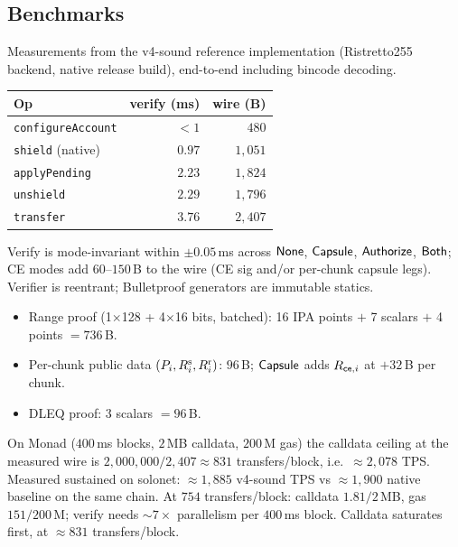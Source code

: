 \subsection{Benchmarks }
\label{sec:benchmarks}

Measurements from the v4-sound reference implementation
(Ristretto255 backend, native release build),
end-to-end including bincode decoding.

%
\begin{center}
\begin{tabular}{@{}l r r@{}}
  \toprule
  \textbf{Op} & \textbf{verify (ms)} & \textbf{wire (B)} \\
  \midrule
  \texttt{configureAccount}     & $<\!1$  & $480$    \\
  \texttt{shield} (native)      & $0.97$  & $1{,}051$ \\
  \texttt{applyPending}         & $2.23$  & $1{,}824$ \\
  \texttt{unshield}             & $2.29$  & $1{,}796$ \\
  \texttt{transfer}             & $3.76$  & $2{,}407$ \\
  \bottomrule
\end{tabular}
\end{center}
%
Verify is mode-invariant within $\pm 0.05$\,ms across $\mathsf{None}$,
$\mathsf{Capsule}$, $\mathsf{Authorize}$, $\mathsf{Both}$; CE modes add $60$--$150$\,B to the
wire (CE sig and/or per-chunk capsule legs).
Verifier is reentrant; Bulletproof generators are immutable statics.

%
\begin{itemize}[itemsep=.5pt]
    \item Range proof (1{$\times$}128 + 4{$\times$}16 bits, batched): 16 IPA points $+$ 7 scalars $+$ 4 points $= 736$\,B.
    \item Per-chunk public data $(P_{i}, R^{\rm s}_{i}, R^{\rm r}_{i})$: $96$\,B; $\mathsf{Capsule}$ adds $R_{{\sf ce},i}$ at $+32$\,B per chunk.
    \item DLEQ proof: $3$ scalars $= 96$\,B.
\end{itemize}

On Monad ($400$\,ms blocks, $2$\,MB calldata, $200$\,M gas) the
calldata ceiling at the measured wire is $2{,}000{,}000 / 2{,}407
\approx 831$ transfers/block, i.e.\ $\approx 2{,}078$ TPS.
Measured sustained on solonet: $\approx 1{,}885$ v4-sound TPS vs
$\approx 1{,}900$ native baseline on the same chain.
At $754$ transfers/block: calldata $1.81/2$\,MB, gas $151/200$\,M;
verify needs $\sim 7\times$ parallelism per $400$\,ms block.
Calldata saturates first, at $\approx 831$ transfers/block.

